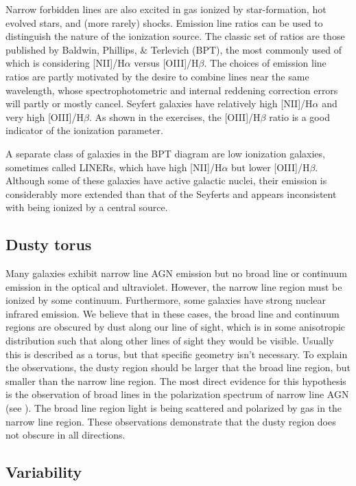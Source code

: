 Narrow forbidden lines are also excited in gas ionized by
star-formation, hot evolved stars, and (more rarely) shocks. Emission
line ratios can be used to distinguish the nature of the ionization
source. The classic set of ratios are those published by Baldwin,
Phillips, \& Terlevich (BPT), the most commonly used of which is
considering [NII]/H$\alpha$ versus [OIII]/H$\beta$. The choices of
emission line ratios are partly motivated by the desire to combine
lines near the same wavelength, whose spectrophotometric and internal
reddening correction errors will partly or mostly cancel. Seyfert
galaxies have relatively high [NII]/H$\alpha$ and very high
[OIII]/H$\beta$. As shown in the exercises, the [OIII]/H$\beta$ ratio
is a good indicator of the ionization parameter.

A separate class of galaxies in the BPT diagram are low ionization
galaxies, sometimes called LINERs, which have high [NII]/H$\alpha$ but
lower [OIII]/H$\beta$. Although some of these galaxies have active
galactic nuclei, their emission is considerably more extended than
that of the Seyferts and appears inconsistent with being ionized by a
central source. 

\subsection{Dusty torus}

Many galaxies exhibit narrow line AGN emission but no broad line or
continuum emission in the optical and ultraviolet. However, the narrow
line region must be ionized by some continuum. Furthermore, some
galaxies have strong nuclear infrared emission. We believe that in
these cases, the broad line and continuum regions are obscured by dust
along our line of sight, which is in some anisotropic distribution
such that along other lines of sight they would be visible. Usually
this is described as a torus, but that specific geometry isn't
necessary. To explain the observations, the dusty region should be
larger that the broad line region, but smaller than the narrow line
region. The most direct evidence for this hypothesis is the
observation of broad lines in the polarization spectrum of narrow line
AGN (see \citealt{antonucci93a}). The broad line region light is being
scattered and polarized by gas in the narrow line region. These
observations demonstrate that the dusty region does not obscure in all
directions.

\subsection{Variability}

